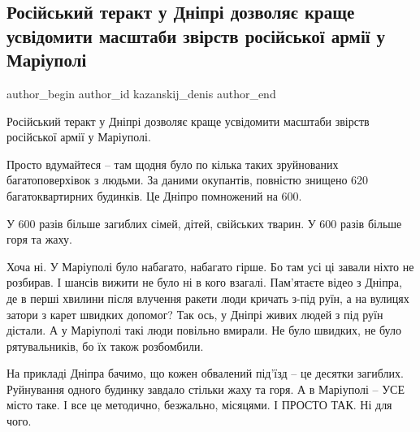  
 
 
 
 

\subsection{Російський теракт у Дніпрі дозволяє краще усвідомити масштаби звірств російської армії у Маріуполі}
\label{sec:16_01_2023.fb.kazanskij_denis.1.ros_iskii_terakt_u_d}

\ifcmt
 author_begin
   author_id kazanskij_denis
 author_end
\fi

Російський теракт у Дніпрі дозволяє краще усвідомити масштаби звірств
російської армії у Маріуполі.

Просто вдумайтеся – там щодня було по кілька таких зруйнованих багатоповерхівок
з людьми. За даними окупантів, повністю знищено 620 багатоквартирних будинків.
Це Дніпро помножений на 600.

У 600 разів більше загиблих сімей, дітей, свійських тварин. У 600 разів більше
горя та жаху.

Хоча ні. У Маріуполі було набагато, набагато гірше. Бо там усі ці завали ніхто
не розбирав. І шансів вижити не було ні в кого взагалі. Пам'ятаєте відео з
Дніпра, де в перші хвилини після влучення ракети люди кричать з-під руїн, а на
вулицях затори з карет швидких допомог? Так ось, у Дніпрі живих людей з під
руїн дістали. А у Маріуполі такі люди повільно вмирали. Не було швидких, не
було рятувальників, бо їх також розбомбили.

На прикладі Дніпра бачимо, що кожен обвалений під'їзд – це десятки загиблих.
Руйнування одного будинку завдало стільки жаху та горя. А в Маріуполі – УСЕ
місто таке. І все це методично, безжально, місяцями. І ПРОСТО ТАК. Ні для чого.
